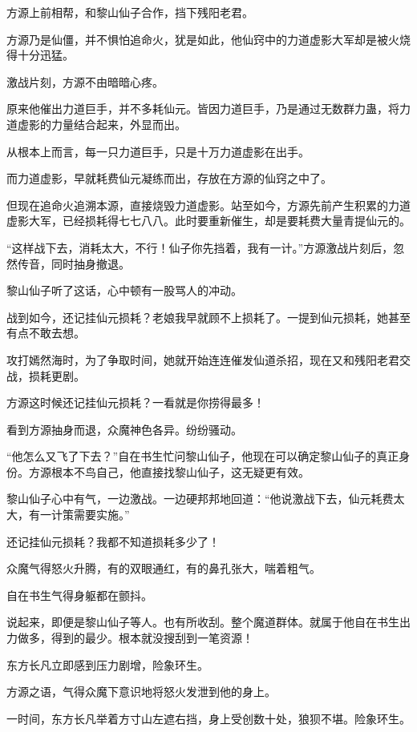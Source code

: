 
\begin{this_body}

方源上前相帮，和黎山仙子合作，挡下残阳老君。

方源乃是仙僵，并不惧怕追命火，犹是如此，他仙窍中的力道虚影大军却是被火烧得十分迅猛。

激战片刻，方源不由暗暗心疼。

原来他催出力道巨手，并不多耗仙元。皆因力道巨手，乃是通过无数群力蛊，将力道虚影的力量结合起来，外显而出。

从根本上而言，每一只力道巨手，只是十万力道虚影在出手。

而力道虚影，早就耗费仙元凝练而出，存放在方源的仙窍之中了。

但现在追命火追溯本源，直接烧毁力道虚影。站至如今，方源先前产生积累的力道虚影大军，已经损耗得七七八八。此时要重新催生，却是要耗费大量青提仙元的。

“这样战下去，消耗太大，不行！仙子你先挡着，我有一计。”方源激战片刻后，忽然传音，同时抽身撤退。

黎山仙子听了这话，心中顿有一股骂人的冲动。

战到如今，还记挂仙元损耗？老娘我早就顾不上损耗了。一提到仙元损耗，她甚至有点不敢去想。

攻打嫣然海时，为了争取时间，她就开始连连催发仙道杀招，现在又和残阳老君交战，损耗更剧。

方源这时候还记挂仙元损耗？一看就是你捞得最多！

看到方源抽身而退，众魔神色各异。纷纷骚动。

“他怎么又飞了下去？”自在书生忙问黎山仙子，他现在可以确定黎山仙子的真正身份。方源根本不鸟自己，他直接找黎山仙子，这无疑更有效。

黎山仙子心中有气，一边激战。一边硬邦邦地回道：“他说激战下去，仙元耗费太大，有一计策需要实施。”

还记挂仙元损耗？我都不知道损耗多少了！

众魔气得怒火升腾，有的双眼通红，有的鼻孔张大，喘着粗气。

自在书生气得身躯都在颤抖。

说起来，即便是黎山仙子等人。也有所收刮。整个魔道群体。就属于他自在书生出力做多，得到的最少。根本就没搜刮到一笔资源！

东方长凡立即感到压力剧增，险象环生。

方源之语，气得众魔下意识地将怒火发泄到他的身上。

一时间，东方长凡举着方寸山左遮右挡，身上受创数十处，狼狈不堪。险象环生。


\end{this_body}
